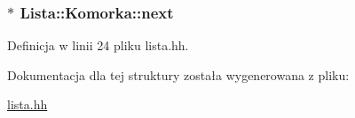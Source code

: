 \hypertarget{struct_lista_1_1_komorka_aa04e9d2ed0260f2adbff6855f7bcd77e}{
\subsubsection[{next}]{$\ast$ Lista\-::\-Komorka\-::next}}\label{struct_lista_1_1_komorka_aa04e9d2ed0260f2adbff6855f7bcd77e}


Definicja w linii 24 pliku lista.\-hh.



Dokumentacja dla tej struktury została wygenerowana z pliku\-:\begin{DoxyCompactItemize}
\item 
\hyperlink{lista_8hh}{lista.\-hh}\end{DoxyCompactItemize}
